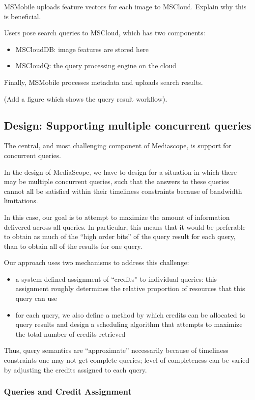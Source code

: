 \documentclass[10pt]{article}
\begin{document}
MSMobile uploads feature vectors for each image to MSCloud. Explain
why this is beneficial.

Users pose search queries to MSCloud, which has two components:
\begin{itemize}
\item MSCloudDB: image features are stored here
\item MSCloudQ: the query processing engine on the cloud
\end{itemize}

Finally, MSMobile processes metadata and uploads search results.

(Add a figure which shows the query result workflow).
\subsection{Design: Supporting multiple concurrent queries}
\label{sec-3-2}


The central, and most challenging component of Mediascope, is support
for concurrent queries.

In the design of MediaScope, we have to design for a situation in
which there may be multiple concurrent queries, such that the answers
to these queries cannot all be satisfied within their timeliness
constraints because of bandwidth limitations.

In this case, our goal is to attempt to maximize the amount of
information delivered across all queries. In particular, this means
that it would be preferable to obtain as much of the ``high order bits''
of the query result for each query, than to obtain all of the results
for one query.

Our approach uses two mechanisms to address this challenge:
\begin{itemize}
\item a system defined assignment of ``credits'' to individual queries: this
  assignment roughly determines the relative proportion of resources
  that this query can use
\item for each query, we also define a method by which credits can be
  allocated to query results and design a scheduling algorithm that
  attempts to maximize the total number of credits retrieved
\end{itemize}

Thus, query semantics are ``approximate'' necessarily because of
timeliness constraints one may not get complete queries; level of
completeness can be varied by  adjusting the credits assigned to each query.
\subsubsection{Queries and Credit Assignment}
\label{sec-3-2-1}
\end{document}

